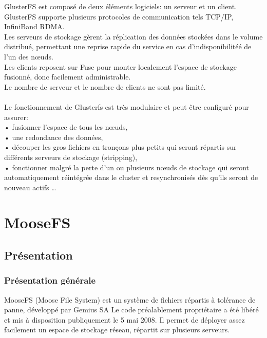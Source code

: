 \documentclass[12pt]{report}
\begin{document}
GlusterFS est composé de deux éléments logiciels: un serveur et un client.\\
GlusterFS supporte plusieurs protocoles de communication tels TCP/IP, InfiniBand RDMA.\\

Les serveurs de stockage gèrent la réplication des données stockées dans le volume distribué, permettant une reprise rapide du service en cas d'indisponibilitéé de l'un des n\oe uds. \\
Les clients reposent sur Fuse pour monter localement l'espace de stockage fusionné, donc facilement administrable.\\
Le nombre de serveur et le nombre de clients ne sont pas limité.\\\\
Le fonctionnement de Glusterfs est très modulaire et peut être configuré pour assurer:\\
   • fusionner l'espace de tous les nœuds,\\
   • une redondance des données,\\
   • découper les gros fichiers en tronçons plus petits qui seront répartis sur différents serveurs de stockage (stripping),\\
   • fonctionner malgré la perte d'un ou plusieurs nœuds de stockage qui seront automatiquement réintégrée dans le cluster et resynchronisés dès qu'ils seront de nouveau actifs \dots \\

	\chapter{MooseFS}
		\section{Présentation}
			\subsection{Présentation générale}
				MooseFS (Moose File System) est un système de fichiers répartis à tolérance de panne, développé par Gemius SA
				Le code préalablement propriétaire a été libéré et mis à disposition publiquement le 5 mai 2008.
				Il permet de déployer assez facilement un espace de stockage réseau, répartit sur plusieurs serveurs.
				
\end{document}
